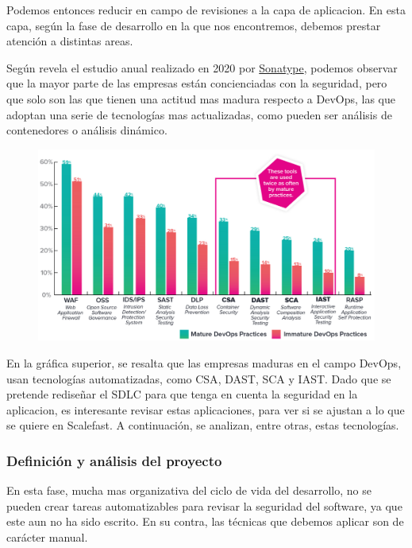 \documentclass[12pt]{report} %
\begin{document}
Podemos entonces reducir en campo de revisiones a la capa de aplicacion.  En
esta capa, según la fase de desarrollo en la que nos encontremos, debemos
prestar atención a distintas areas.

Según revela el estudio anual \nocite{sonatype2020} realizado en 2020 por
\href{https://sonatype.com}{Sonatype}, podemos observar que la mayor parte de
las empresas están concienciadas con la seguridad, pero que solo son las que
tienen una actitud mas madura respecto a DevOps, las que adoptan una serie de
tecnologías mas actualizadas, como pueden ser análisis de contenedores o
análisis dinámico.

\begin{figure}[H] \includegraphics[width=\textwidth]{sonatype-tools}
\end{figure}

En la gráfica superior, se resalta que las empresas maduras en el campo DevOps,
usan tecnologías automatizadas, como \gls{CSA}, \gls{DAST}, \gls{SCA} y
\gls{IAST}.  Dado que se pretende rediseñar el \gls{SDLC} para que tenga en
cuenta la seguridad en la aplicacion, es interesante revisar estas aplicaciones,
para ver si se ajustan a lo que se quiere en Scalefast.  A continuación, se
analizan, entre otras, estas tecnologías.

\subsubsection{Definición y análisis del proyecto}

En esta fase, mucha mas organizativa del ciclo de vida del desarrollo, no se
pueden crear tareas automatizables para revisar la seguridad del software, ya
que este aun no ha sido escrito.  En su contra, las técnicas que debemos aplicar
son de carácter manual.
\end{document}
